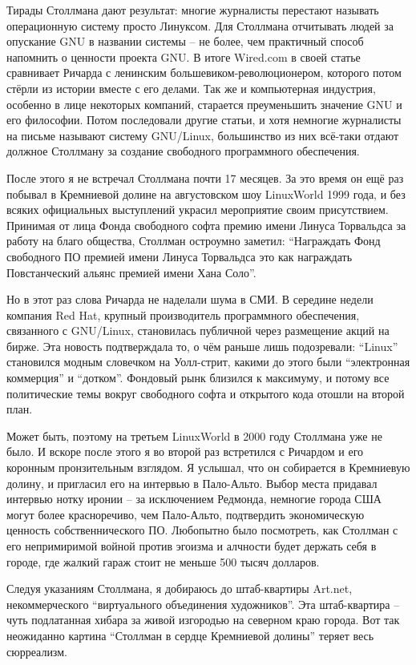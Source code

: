 Тирады Столлмана дают результат: многие журналисты перестают называть операционную систему просто Линуксом. Для Столлмана отчитывать людей за опускание GNU в названии системы  -- не более, чем практичный способ напомнить о ценности проекта GNU. В итоге Wired.com в своей статье сравнивает Ричарда с ленинским большевиком-революционером, которого потом стёрли из истории вместе с его делами. Так же и компьютерная индустрия, особенно в лице некоторых компаний, старается преуменьшить значение GNU и его философии. Потом последовали другие статьи, и хотя немногие журналисты на письме называют систему GNU/Linux, большинство из них всё-таки отдают должное Столлману за создание свободного программного обеспечения.

После этого я не встречал Столлмана почти 17 месяцев. За это время он ещё раз побывал в Кремниевой долине на августовском шоу LinuxWorld 1999 года, и без всяких официальных выступлений украсил мероприятие своим присутствием. Принимая от лица Фонда свободного софта премию имени Линуса Торвальдса за работу на благо общества, Столлман остроумно заметил: \enquote{Награждать Фонд свободного ПО премией имени Линуса Торвальдса это как награждать Повстанческий альянс премией имени Хана Соло}.

Но в этот раз слова Ричарда не наделали шума в СМИ. В середине недели компания Red Hat, крупный производитель программного обеспечения, связанного с GNU/Linux, становилась публичной через размещение акций на бирже. Эта новость подтверждала то, о чём раньше лишь подозревали: \enquote{Linux} становился модным словечком на Уолл-стрит, какими до этого были \enquote{электронная коммерция} и \enquote{дотком}. Фондовый рынк близился к максимуму, и потому все политические темы вокруг свободного софта и открытого кода отошли на второй план.

Может быть, поэтому на третьем LinuxWorld в 2000 году Столлмана уже не было. И вскоре после этого я во второй раз встретился с Ричардом и его коронным пронзительным взглядом. Я услышал, что он собирается в Кремниевую долину, и пригласил его на интервью в Пало-Альто. Выбор места придавал интервью нотку иронии -- за исключением Редмонда, немногие города США могут более красноречиво, чем Пало-Альто, подтвердить экономическую ценность собственнического ПО. Любопытно было посмотреть, как Столлман с его непримиримой войной против эгоизма и алчности будет держать себя в городе, где жалкий гараж стоит не меньше 500 тысяч долларов.

Следуя указаниям Столлмана, я добираюсь до штаб-квартиры Art.net, некоммерческого \enquote{виртуального объединения художников}. Эта штаб-квартира -- чуть подлатанная хибара за живой изгородью на северном краю города. Вот так неожиданно картина \enquote{Столлман в сердце Кремниевой долины} теряет весь сюрреализм.

